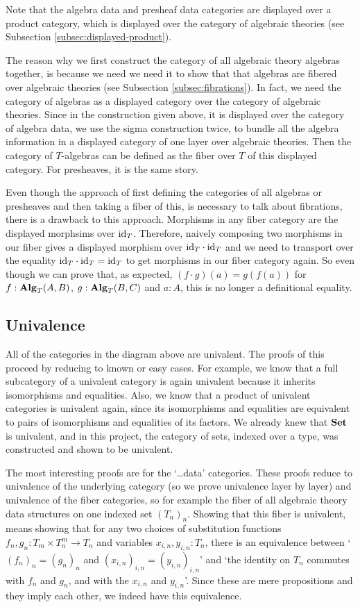 Note that the algebra data and presheaf data categories are displayed over a product category, which is displayed over the category of algebraic theories (see Subsection \ref{subsec:displayed-product}).

The reason why we first construct the category of all algebraic theory algebras together, is because we need we need it to show that that algebras are fibered over algebraic theories (see Subsection \ref{subsec:fibrations}). In fact, we need the category of algebras as a displayed category over the category of algebraic theories. Since in the construction given above, it is displayed over the category of algebra data, we use the sigma construction twice, to bundle all the algebra information in a displayed category of one layer over algebraic theories. Then the category of $ T $-algebras can be defined as the fiber over $ T $ of this displayed category. For presheaves, it is the same story.

Even though the approach of first defining the categories of all algebras or presheaves and then taking a fiber of this, is necessary to talk about fibrations, there is a drawback to this approach. Morphisms in any fiber category are the displayed morphsims over $ \text{id}_{T} $. Therefore, naively composing two morphisms in our fiber gives a displayed morphism over $ \text{id}_{T} \cdot \text{id}_{T} $ and we need to transport over the equality $ \text{id}_{T} \cdot \text{id}_{T} = \text{id}_{T} $ to get morphisms in our fiber category again. So even though we can prove that, as expected, $ (f \cdot g)(a) = g(f(a)) $ for $ f: \mathbf{Alg}_{T}(A, B) $, $ g: \mathbf{Alg}_{T}(B, C) $ and $ a : A $, this is no longer a definitional equality.

\subsection{Univalence}
All of the categories in the diagram above are univalent. The proofs of this proceed by reducing to known or easy cases. For example, we know that a full subcategory of a univalent category is again univalent because it inherits isomorphisms and equalities. Also, we know that a product of univalent categories is univalent again, since its isomorphisms and equalities are equivalent to pairs of isomorphisms and equalities of its factors. We already knew that $ \mathbf{Set} $ is univalent, and in this project, the category of sets, indexed over a type, was constructed and shown to be univalent.

The most interesting proofs are for the `\dots data' categories. These proofs reduce to univalence of the underlying category (so we prove univalence layer by layer) and univalence of the fiber categories, so for example the fiber of all algebraic theory data structures on one indexed set $ (T_n)_n $. Showing that this fiber is univalent, means showing that for any two choices of substitution functions $ f_n, g_n: T_m \times T_n^m \to T_n $ and variables $ x_{i, n}, y_{i, n} : T_n $, there is an equivalence between `$ (f_n)_n = (g_n)_n $ and $ (x_{i, n})_{i, n} = (y_{i, n})_{i, n} $' and `the identity on $ T_n $ commutes with $ f_n $ and $ g_n $, and with the $ x_{i, n} $ and $ y_{i, n} $'. Since these are mere propositions and they imply each other, we indeed have this equivalence.

